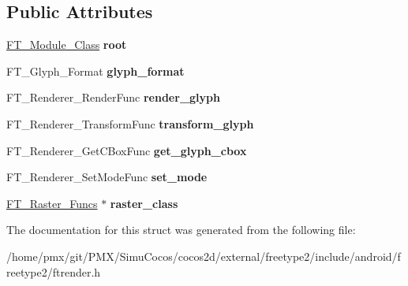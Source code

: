 \subsection*{Public Attributes}
\begin{DoxyCompactItemize}
\item 
\mbox{\label{structFT__Renderer__Class___a3df4509f1de704596bf4237d6ff8cbd4}} 
\hyperlink{structFT__Module__Class__}{F\+T\+\_\+\+Module\+\_\+\+Class} {\bfseries root}
\item 
\mbox{\label{structFT__Renderer__Class___a2c8602452fae27379a6f85bbcb4b525c}} 
F\+T\+\_\+\+Glyph\+\_\+\+Format {\bfseries glyph\+\_\+format}
\item 
\mbox{\label{structFT__Renderer__Class___a7a022b8358ce3a06620c62f3542d0d2b}} 
F\+T\+\_\+\+Renderer\+\_\+\+Render\+Func {\bfseries render\+\_\+glyph}
\item 
\mbox{\label{structFT__Renderer__Class___a2aef09ecdabacf5628ef29fb3d179def}} 
F\+T\+\_\+\+Renderer\+\_\+\+Transform\+Func {\bfseries transform\+\_\+glyph}
\item 
\mbox{\label{structFT__Renderer__Class___a4f9dc9b6d86504a8d3b04b4e72936e76}} 
F\+T\+\_\+\+Renderer\+\_\+\+Get\+C\+Box\+Func {\bfseries get\+\_\+glyph\+\_\+cbox}
\item 
\mbox{\label{structFT__Renderer__Class___a7cfd4795107157aad4f7efcab77a0f64}} 
F\+T\+\_\+\+Renderer\+\_\+\+Set\+Mode\+Func {\bfseries set\+\_\+mode}
\item 
\mbox{\label{structFT__Renderer__Class___a319d89f0bf85f1002987855f16801da0}} 
\hyperlink{structFT__Raster__Funcs__}{F\+T\+\_\+\+Raster\+\_\+\+Funcs} $\ast$ {\bfseries raster\+\_\+class}
\end{DoxyCompactItemize}


The documentation for this struct was generated from the following file\+:\begin{DoxyCompactItemize}
\item 
/home/pmx/git/\+P\+M\+X/\+Simu\+Cocos/cocos2d/external/freetype2/include/android/freetype2/ftrender.\+h\end{DoxyCompactItemize}
